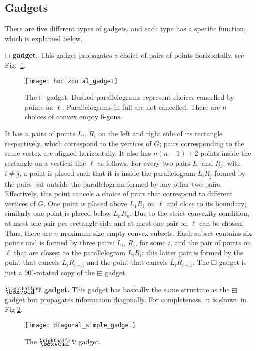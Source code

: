 \documentclass[11pt,a4paper]{article}
\let\boxminusnew\boxminus
\newcommand*{\boxangle}{\mathrel{
\vcenter{\offinterlineskip
\hbox{\scalebox{.76}[0.85]{$\righthalfcup$}}\vskip-.9ex\hbox{$\boxvoid$}}}}
\newcommand{\boxvertnew}{\rotatebox[origin=c]{90}{$\boxminusnew$}}
\begin{document}
\subsection{Gadgets}
\label{sec:gadgets}

There are five different types of gadgets, and each type has a specific function, which is explained below.

\medskip
\noindent
{$\boxminusnew$ \textbf {gadget.}} This gadget propagates a choice of pairs of points horizontally, see Fig.~\ref{fig:horizontal_gadget}. 
\begin{figure}[h]
\centering
	\texttt{[image: horizontal\_gadget]}
	\caption{The $\boxminusnew$ gadget. Dashed parallelograms represent choices cancelled by points on $\ell$. Parallelograms in full are not cancelled. There are $n$ choices of convex empty $6$-gons.}
	\label{fig:horizontal_gadget}
\end{figure}
It has $n$ pairs of points $L_i$, $R_i$ on the left and right side of its rectangle respectively, which correspond to the vertices of $G$; pairs corresponding to the same vertex are aligned horizontally. It also has $n(n-1)+2$ points inside the rectangle on a vertical line $\ell$ as follows. For every two pairs $L_i$ and $R_j$, with $i\neq j$, a point is placed such that it is inside the parallelogram $L_iR_j$ formed by the pairs but outside the parallelogram formed by any other two pairs. Effectively, this point cancels a choice of pairs that correspond to different vertices of $G$. One point is placed above $L_1R_1$ on $\ell$ and close to its boundary; similarly one point is placed below $L_nR_n$.  Due to the strict convexity condition, at most one pair per rectangle side and at most one pair on $\ell$ can be chosen. Thus, there are $n$ maximum size empty convex subsets. Each subset contains six points and is formed by three pairs: $L_i$, $R_i$, for some $i$, and the pair of points on $\ell$ that are closest to the parallelogram $L_iR_i$; this latter pair is formed by the point that cancels $L_iR_{i-1}$ and the point that cancels $L_iR_{i+1}$. The $\boxvertnew$ gadget is just a $90^{\circ}$-rotated copy of the $\boxminusnew$ gadget.

\medskip
\noindent
{$\boxangle$ \textbf{gadget.}} This gadget has basically the same structure as the $\boxminusnew$ gadget but propagates information diagonally. For completeness, it is shown in Fig \ref{fig:diagonal_simple_gadget}.
\begin{figure}[h]
\centering
	\texttt{[image: diagonal\_simple\_gadget]}
	\caption[]{The $\boxangle$ gadget.}
	\label{fig:diagonal_simple_gadget}
\end{figure}
\end{document}
